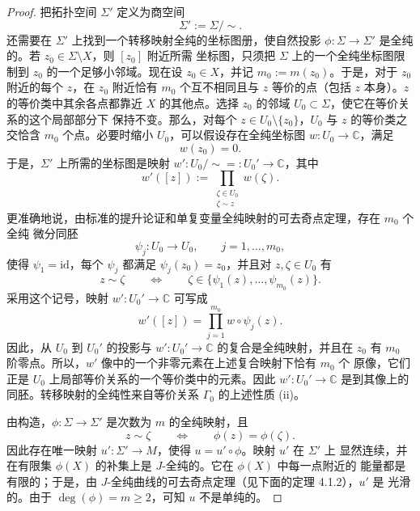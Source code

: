 \begin{proof}
把拓扑空间 $\Sigma'$ 定义为商空间
\[
  \Sigma':=\Sigma/{\sim}.
\]
还需要在 $\Sigma'$ 上找到一个转移映射全纯的坐标图册，使自然投影
$\phi:\Sigma\to\Sigma'$ 是全纯的。若 $z_0\in\Sigma\setminus X$，则 $[z_0]$ 附近所需
坐标图，只须把 $\Sigma$ 上的一个全纯坐标图限制到 $z_0$ 的一个足够小邻域。现在设
$z_0\in X$，并记 $m_0:=m(z_0)$。于是，对于 $z_0$ 附近的每个 $z$，在 $z_0$ 附近恰有
$m_0$ 个互不相同且与 $z$ 等价的点（包括 $z$ 本身）。$z$ 的等价类中其余各点都靠近
$X$ 的其他点。选择 $z_0$ 的邻域 $U_0\subset\Sigma$，使它在等价关系的这个局部部分下
保持不变。那么，对每个 $z\in U_0\setminus\{z_0\}$，$U_0$ 与 $z$ 的等价类之交恰含
$m_0$ 个点。必要时缩小 $U_0$，可以假设存在全纯坐标图 $w:U_0\to\mathbb C$，满足
\[
  w(z_0)=0.
\]
于是，$\Sigma'$ 上所需的坐标图是映射 $w':U_0/{\sim}=:U_0'\to\mathbb C$，其中
\[
  w'([z]):=\prod_{\substack{\zeta\in U_0\\ \zeta\sim z}}w(\zeta).
\]
更准确地说，由标准的提升论证和单复变量全纯映射的可去奇点定理，存在 $m_0$ 个全纯
微分同胚
\[
  \psi_j:U_0\to U_0,
  \qquad j=1,\ldots,m_0,
\]
使得 $\psi_1=\mathrm{id}$，每个 $\psi_j$ 都满足 $\psi_j(z_0)=z_0$，并且对
$z,\zeta\in U_0$ 有
\[
  z\sim\zeta
  \qquad\Longleftrightarrow\qquad
  \zeta\in\{\psi_1(z),\ldots,\psi_{m_0}(z)\}.
\]
采用这个记号，映射 $w':U_0'\to\mathbb C$ 可写成
\[
  w'([z])=\prod_{j=1}^{m_0}w\circ\psi_j(z).
\]
因此，从 $U_0$ 到 $U_0'$ 的投影与 $w':U_0'\to\mathbb C$ 的复合是全纯映射，并且在
$z_0$ 有 $m_0$ 阶零点。所以，$w'$ 像中的一个非零元素在上述复合映射下恰有 $m_0$ 个
原像，它们正是 $U_0$ 上局部等价关系的一个等价类中的元素。因此
$w':U_0'\to\mathbb C$ 是到其像上的同胚。转移映射的全纯性来自等价关系 $\Gamma_0$
的上述性质 (ii)。

由构造，$\phi:\Sigma\to\Sigma'$ 是次数为 $m$ 的全纯映射，且
\begin{equation}\label{eq:2-5-1}
  z\sim\zeta
  \qquad\Longleftrightarrow\qquad
  \phi(z)=\phi(\zeta).
\end{equation}
因此存在唯一映射 $u':\Sigma'\to M$，使得 $u=u'\circ\phi$。映射 $u'$ 在 $\Sigma'$ 上
显然连续，并在有限集 $\phi(X)$ 的补集上是 $J$-全纯的。它在 $\phi(X)$ 中每一点附近的
能量都是有限的；于是，由 $J$-全纯曲线的可去奇点定理（见下面的定理 4.1.2），$u'$ 是
光滑的。由于 $\deg(\phi)=m\ge2$，可知 $u$ 不是单纯的。
\end{proof}

